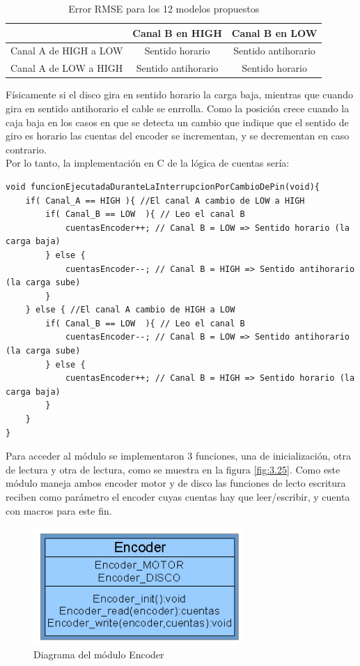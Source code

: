 \begin{table}[!ht]
	\begin{center}
		
		\begin{tabular}{|c|c|c|}
			\hline
			 & Canal B en HIGH & Canal B en LOW   \\
			\hline 
			Canal A de HIGH a LOW & Sentido horario & Sentido antihorario\\
			\hline 
			Canal A de LOW a HIGH & Sentido antihorario & Sentido horario\\
			\hline
		\end{tabular}
	\end{center}
	\caption{Error RMSE para los 12 modelos propuestos}
	\label{table:\thetable}
\end{table}

Físicamente si el disco gira en sentido horario la carga baja, mientras que cuando gira en sentido antihorario el cable se enrrolla. Como la posición crece cuando la caja baja en los casos en que se detecta un cambio que indique que el sentido de giro es horario las cuentas del encoder se incrementan, y se decrementan en caso contrario.\\
Por lo tanto, la implementación en C de la lógica de cuentas sería:
\begin{lstlisting}[style=CStyle]
void funcionEjecutadaDuranteLaInterrupcionPorCambioDePin(void){
	if( Canal_A == HIGH ){ //El canal A cambio de LOW a HIGH
		if( Canal_B == LOW  ){ // Leo el canal B
			cuentasEncoder++; // Canal B = LOW => Sentido horario (la carga baja)
		} else {
			cuentasEncoder--; // Canal B = HIGH => Sentido antihorario (la carga sube)
		}
	} else { //El canal A cambio de HIGH a LOW
		if( Canal_B == LOW  ){ // Leo el canal B
			cuentasEncoder--; // Canal B = LOW => Sentido antihorario (la carga sube)
		} else {
			cuentasEncoder++; // Canal B = HIGH => Sentido horario (la carga baja)
		}
	}
}
\end{lstlisting}


Para acceder al módulo se implementaron 3 funciones, una de inicialización, otra de lectura y otra de lectura, como se muestra en la figura \ref{fig:3.25}. Como este módulo maneja ambos encoder motor y de disco las funciones de lecto escritura reciben como parámetro el encoder cuyas cuentas hay que leer/escribir, y cuenta con macros para este fin.

\begin{figure}[!ht]
	\centering
	\includegraphics[width=8cm,scale=1]{resources/3_25-moduloEncoder.png}
	\caption{Diagrama del módulo Encoder}
	\label{fig:\thefigure}
\end{figure}


